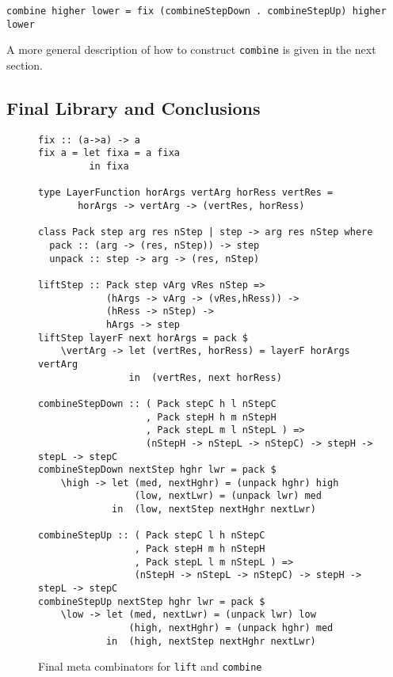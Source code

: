 \begin{small}
\begin{verbatim}
combine higher lower = fix (combineStepDown . combineStepUp) higher lower
\end{verbatim}
\end{small}

A more general description of how to construct \texttt{combine} is given in the next section.


%																
\subsection{Final Library and Conclusions}

\begin{figure}
\begin{small}
\begin{center}
\begin{footnotesize}
\begin{verbatim}
fix :: (a->a) -> a
fix a = let fixa = a fixa
         in fixa

type LayerFunction horArgs vertArg horRess vertRes =
       horArgs -> vertArg -> (vertRes, horRess)

class Pack step arg res nStep | step -> arg res nStep where
  pack :: (arg -> (res, nStep)) -> step
  unpack :: step -> arg -> (res, nStep)

liftStep :: Pack step vArg vRes nStep => 
            (hArgs -> vArg -> (vRes,hRess)) ->
            (hRess -> nStep) -> 
            hArgs -> step
liftStep layerF next horArgs = pack $
    \vertArg -> let (vertRes, horRess) = layerF horArgs vertArg                     
                in  (vertRes, next horRess)

combineStepDown :: ( Pack stepC h l nStepC 
                   , Pack stepH h m nStepH
                   , Pack stepL m l nStepL ) => 
                   (nStepH -> nStepL -> nStepC) -> stepH -> stepL -> stepC
combineStepDown nextStep hghr lwr = pack $
    \high -> let (med, nextHghr) = (unpack hghr) high
                 (low, nextLwr) = (unpack lwr) med
             in  (low, nextStep nextHghr nextLwr)

combineStepUp :: ( Pack stepC l h nStepC 
                 , Pack stepH m h nStepH
                 , Pack stepL l m nStepL ) => 
                 (nStepH -> nStepL -> nStepC) -> stepH -> stepL -> stepC
combineStepUp nextStep hghr lwr = pack $
    \low -> let (med, nextLwr) = (unpack lwr) low
                (high, nextHghr) = (unpack hghr) med
            in  (high, nextStep nextHghr nextLwr)
\end{verbatim}
\end{footnotesize}\caption{Final meta combinators for \texttt{lift} and \texttt{combine}}\label{metacombinators} 
\end{center}
\end{small}
\end{figure}


